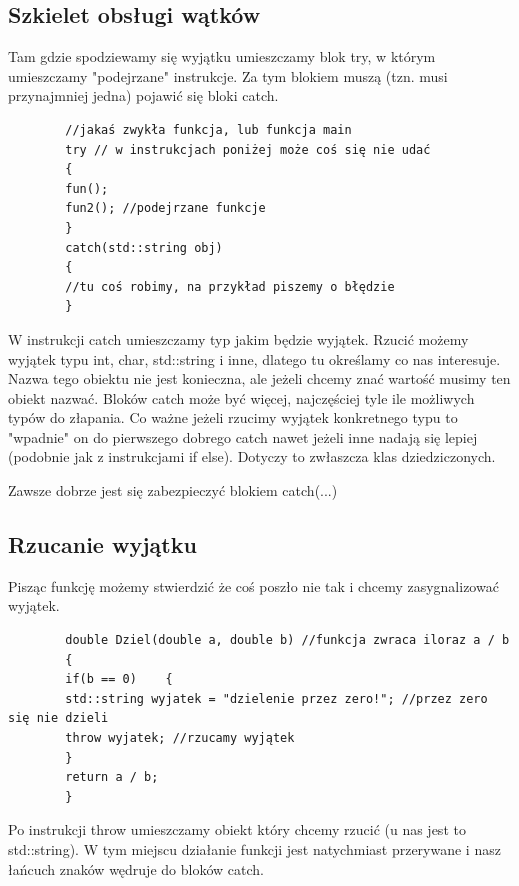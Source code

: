 \documentclass[12pt]{article}
\begin{document}
    \subsection{Szkielet obsługi wątków}

    Tam gdzie spodziewamy się wyjątku umieszczamy blok try, w którym umieszczamy "podejrzane" instrukcje. Za tym blokiem muszą (tzn. musi przynajmniej jedna) pojawić się bloki catch.

    \begin{verbatim}
        //jakaś zwykła funkcja, lub funkcja main
        try // w instrukcjach poniżej może coś się nie udać
        {
        fun();
        fun2(); //podejrzane funkcje
        }
        catch(std::string obj)
        {
        //tu coś robimy, na przykład piszemy o błędzie
        }
    \end{verbatim}

    W instrukcji catch umieszczamy typ jakim będzie wyjątek. Rzucić możemy wyjątek typu int, char, std::string i inne, dlatego tu określamy co nas interesuje. Nazwa tego obiektu nie jest konieczna, ale jeżeli chcemy znać wartość musimy ten obiekt nazwać. Bloków catch może być więcej, najczęściej tyle ile możliwych typów do złapania. Co ważne jeżeli rzucimy wyjątek konkretnego typu to "wpadnie" on do pierwszego dobrego catch nawet jeżeli inne nadają się lepiej (podobnie jak z instrukcjami if else). Dotyczy to zwłaszcza klas dziedziczonych.

    Zawsze dobrze jest się zabezpieczyć blokiem
    catch(...)

    \subsection{Rzucanie wyjątku}
    Pisząc funkcję możemy stwierdzić że coś poszło nie tak i chcemy zasygnalizować wyjątek.

    \begin{verbatim}
        double Dziel(double a, double b) //funkcja zwraca iloraz a / b
        {
        if(b == 0)    {
        std::string wyjatek = "dzielenie przez zero!"; //przez zero się nie dzieli
        throw wyjatek; //rzucamy wyjątek
        }
        return a / b;
        }
    \end{verbatim}

    Po instrukcji throw umieszczamy obiekt który chcemy rzucić (u nas jest to std::string). W tym miejscu działanie funkcji jest natychmiast przerywane i nasz łańcuch znaków wędruje do bloków catch.
\end{document}
